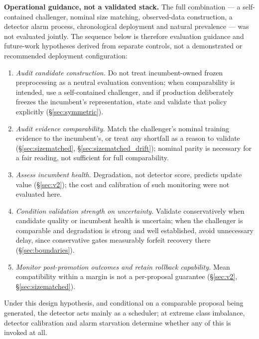 \documentclass[journal]{IEEEtran}
\begin{document}
\textbf{Operational guidance, not a validated stack.} The full combination --- a self-contained challenger, nominal size matching, observed-data construction, a detector alarm process, chronological deployment and natural prevalence --- was not evaluated jointly. The sequence below is therefore evaluation guidance and future-work hypotheses derived from separate controls, not a demonstrated or recommended deployment configuration:
\begin{enumerate}
  \item \emph{Audit candidate construction.} Do not treat incumbent-owned frozen preprocessing as a neutral evaluation convention; when comparability is intended, use a self-contained challenger, and if production deliberately freezes the incumbent's representation, state and validate that policy explicitly (\S\ref{sec:symmetric}).
  \item \emph{Audit evidence comparability.} Match the challenger's nominal training evidence to the incumbent's, or treat any shortfall as a reason to validate (\S\ref{sec:sizematched}, \S\ref{sec:sizematched_drift}); nominal parity is necessary for a fair reading, not sufficient for full comparability.
  \item \emph{Assess incumbent health.} Degradation, not detector score, predicts update value (\S\ref{sec:v2}); the cost and calibration of such monitoring were not evaluated here.
  \item \emph{Condition validation strength on uncertainty.} Validate conservatively when candidate quality or incumbent health is uncertain; when the challenger is comparable and degradation is strong and well established, avoid unnecessary delay, since conservative gates measurably forfeit recovery there (\S\ref{sec:boundaries}).
  \item \emph{Monitor post-promotion outcomes and retain rollback capability.} Mean compatibility within a margin is not a per-proposal guarantee (\S\ref{sec:v2}, \S\ref{sec:sizematched}).
\end{enumerate}
Under this design hypothesis, and conditional on a comparable proposal being generated, the detector acts mainly as a scheduler; at extreme class imbalance, detector calibration and alarm starvation determine whether any of this is invoked at all.
\end{document}
